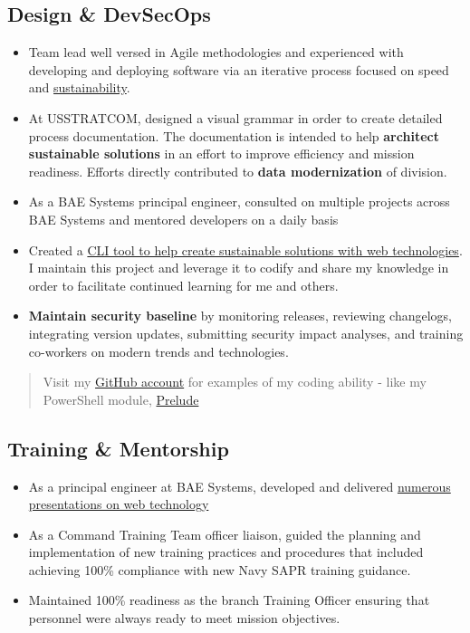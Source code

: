 \documentclass[10pt]{article}
\def\tightlist{}
\begin{document}
\hypertarget{design-devsecops}{%
\subsection{Design \& DevSecOps}\label{design-devsecops}}

\begin{itemize}
\tightlist
\item
  Team lead well versed in Agile methodologies and experienced with
  developing and deploying software via an iterative process focused on
  speed and \href{http://sustainable.surge.sh/}{sustainability}.
\item
  At USSTRATCOM, designed a visual grammar in order to create detailed
  process documentation. The documentation is intended to help
  \textbf{architect sustainable solutions} in an effort to improve
  efficiency and mission readiness. Efforts directly contributed to
  \textbf{data modernization} of division.
\item
  As a BAE Systems principal engineer, consulted on multiple projects
  across BAE Systems and mentored developers on a daily basis
\item
  Created a \href{https://github.com/jhwohlgemuth/tomo-cli}{CLI tool to
  help create sustainable solutions with web technologies}. I maintain
  this project and leverage it to codify and share my knowledge in order
  to facilitate continued learning for me and others.
\item
  \textbf{Maintain security baseline} by monitoring releases, reviewing
  changelogs, integrating version updates, submitting security impact
  analyses, and training co-workers on modern trends and technologies.
\end{itemize}

\begin{quote}
Visit my \href{https://github.com/jhwohlgemuth}{GitHub account} for
examples of my coding ability - like my PowerShell module,
\href{https://github.com/jhwohlgemuth/pwsh-prelude}{Prelude}
\end{quote}

\hypertarget{training-mentorship}{%
\subsection{Training \& Mentorship}\label{training-mentorship}}

\begin{itemize}
\tightlist
\item
  As a principal engineer at BAE Systems, developed and delivered
  \href{https://github.com/jhwohlgemuth?utf8=\%E2\%9C\%93\&tab=repositories\&q=slides\&type=source\&language=}{numerous
  presentations on web technology}
\item
  As a Command Training Team officer liaison, guided the planning and
  implementation of new training practices and procedures that included
  achieving 100\% compliance with new Navy SAPR training guidance.
\item
  Maintained 100\% readiness as the branch Training Officer ensuring
  that personnel were always ready to meet mission objectives.
\end{itemize}
\end{document}
